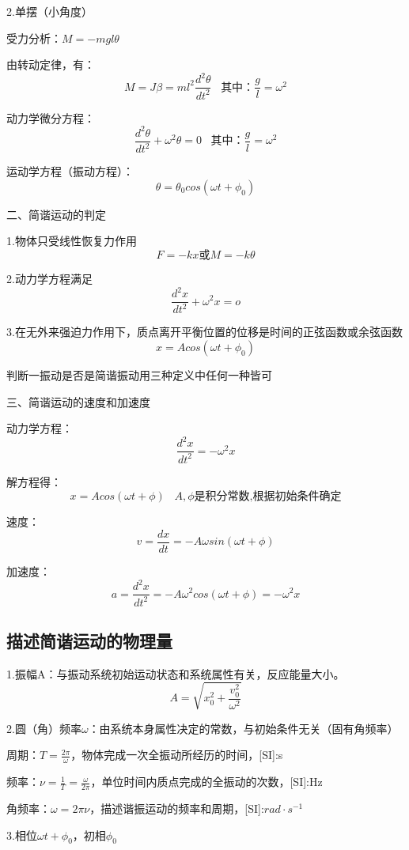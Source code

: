 \documentclass[UTF8]{article}
\begin{document}
    2.单摆（小角度）

    受力分析：$M = -mgl\theta$

    由转动定律，有：
    \[M = J\beta = ml^2\frac{d^2\theta}{dt^2}\;\;\;\mbox{其中：}\frac{g}{l} = \omega^2\]

    动力学微分方程：
    \[\frac{d^2\theta}{dt^2} + \omega^2\theta = 0\;\;\;\mbox{其中：}\frac{g}{l} = \omega^2\]

    运动学方程（振动方程）：
    \[\theta = \theta_0cos(\omega t + \phi_0)\]

    二、简谐运动的判定

    1.物体只受线性恢复力作用
    \[F = -kx\mbox{或}M= -k\theta\]

    2.动力学方程满足
    \[\frac{d^2x}{dt^2} + \omega^2x = o\]

    3.在无外来强迫力作用下，质点离开平衡位置的位移是时间的正弦函数或余弦函数
    \[x = Acos(\omega t + \phi_0)\]

    判断一振动是否是简谐振动用三种定义中任何一种皆可

    三、简谐运动的速度和加速度

    动力学方程：
    \[\frac{d^2x}{dt^2} = -\omega^2 x\]

    解方程得：
    \[x = Acos(\omega t + \phi)\;\;\;A,\phi\mbox{是积分常数,根据初始条件确定}\]

    速度：
    \[v = \frac{dx}{dt} = -A\omega sin(\omega t + \phi)\]

    加速度：
    \[a = \frac{d^2x}{dt^2} = -A\omega^2cos(\omega t + \phi) = -\omega^2x\]

\subsection{描述简谐运动的物理量}

    1.振幅A：与振动系统初始运动状态和系统属性有关，反应能量大小。
    \[A = \sqrt{x_0^2 + \frac{v_0^2}{\omega^2}}\]

    2.圆（角）频率$\omega$：由系统本身属性决定的常数，与初始条件无关（固有角频率）

    周期：$T = \frac{2\pi}{\omega}$，物体完成一次全振动所经历的时间，[SI]:s

    频率：$\nu = \frac{1}{T} = \frac{\omega}{2\pi}$，单位时间内质点完成的全振动的次数，[SI]:Hz

    角频率：$\omega = 2\pi\nu$，描述谐振运动的频率和周期，[SI]:$rad\cdot s^{-1}$

    3.相位$\omega t + \phi_0$，初相$\phi_0$
\end{document}
